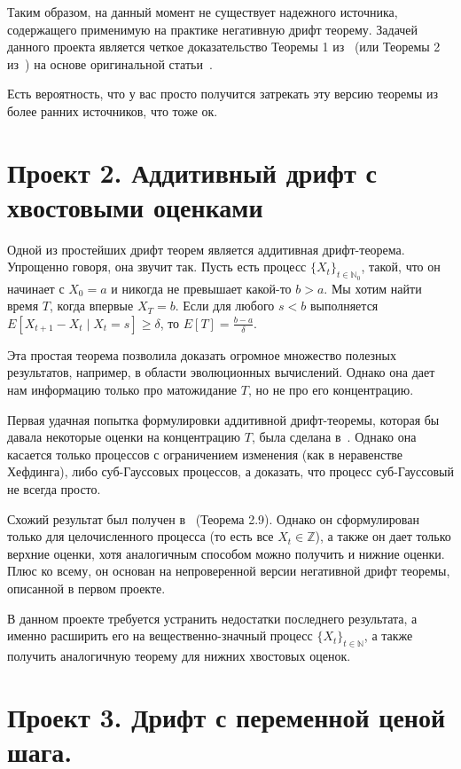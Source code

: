 \documentclass[12pt]{article}
\newcommand\N{\mathbb{N}}
\newcommand\Z{\mathbb{Z}}
\begin{document}
Таким образом, на данный момент не существует надежного источника, содержащего применимую на практике негативную дрифт теорему. Задачей данного проекта является четкое доказательство Теоремы 1 из~\cite{OlivetoW12} (или Теоремы 2 из~\cite{OlivetoW11}) на основе оригинальной статьи~\cite{Hajek82}.

Есть вероятность, что у вас просто получится затрекать эту версию теоремы из более ранних источников, что тоже ок.

\section*{Проект 2. Аддитивный дрифт с хвостовыми оценками}

Одной из простейших дрифт теорем является аддитивная дрифт-теорема. Упрощенно говоря, она звучит так. Пусть есть процесс $\{X_t\}_{t \in \N_0}$, такой, что он начинает с $X_0 = a$ и никогда не превышает какой-то $b > a$. Мы хотим найти время $T$, когда впервые $X_T = b$. Если для любого $s < b$ выполняется $E[X_{t + 1} - X_t \mid X_t = s] \ge \delta$, то $E[T] = \frac{b - a}{\delta}$.

Эта простая теорема позволила доказать огромное множество полезных результатов, например, в области эволюционных вычислений. Однако она дает нам информацию только про матожидание $T$, но не про его концентрацию.

Первая удачная попытка формулировки аддитивной дрифт-теоремы, которая бы давала некоторые оценки на концентрацию $T$, была сделана в~\cite{Kotzing16}. Однако она касается только процессов с ограничением изменения (как в неравенстве Хефдинга), либо суб-Гауссовых процессов, а доказать, что процесс суб-Гауссовый не всегда просто. 

Схожий результат был получен в~\cite{AntipovDK19} (Теорема 2.9). Однако он сформулирован только для целочисленного процесса (то есть все $X_t \in \Z$), а также он  дает только верхние оценки, хотя аналогичным способом можно получить и нижние оценки. Плюс ко всему, он основан на непроверенной версии негативной дрифт теоремы, описанной в первом проекте.

В данном проекте требуется устранить недостатки последнего результата, а именно расширить его на вещественно-значный процесс $\{X_t\}_{t \in \N}$, а также получить аналогичную теорему для нижних хвостовых оценок.

\section*{Проект 3. Дрифт с переменной ценой шага.}
\end{document}
